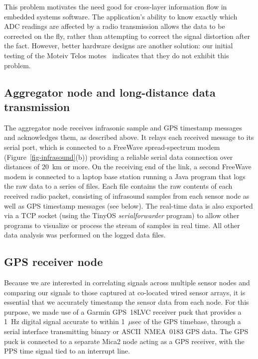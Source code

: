 This problem motivates the need good for cross-layer information flow 
in embedded systems software. The application's ability to know
exactly which ADC readings are affected by a radio transmission allows
the data to be corrected on the fly, rather than attempting to
correct the signal distortion after the fact.
However, better hardware designs are another solution: our initial testing 
of the Moteiv Telos motes~\cite{telos} indicates that they do not exhibit
this problem.

\subsection{Aggregator node and long-distance data transmission}

The aggregator node receives infrasonic sample and GPS timestamp 
messages and acknowledges them, as described above. It 
relays each received message to its serial port, which is connected 
to a FreeWave spread-spectrum modem (Figure~\ref{fig-infrasound}(b)) providing
a reliable serial data connection over distances of 20~km or more. 
On the receiving end of the link, a second FreeWave modem is connected to a
laptop base station running a Java program that logs the raw data to a series
of files. Each file contains the raw contents of each
received radio packet, consisting of infrasound samples from each
sensor node as well as GPS timestamp messages (see below). The
real-time data is also exported via a TCP socket (using the TinyOS
{\em serialforwarder} program) to allow other programs to visualize 
or process the stream of samples in real time. 
All other data analysis was performed on the logged data files.

\subsection{GPS receiver node}
\label{sec-gps}

Because we are interested in correlating signals across multiple
sensor nodes and comparing our signals to those captured at
co-located wired sensor arrays, it is essential that we
accurately timestamp the sensor data from each
node. For this purpose, we made use of a Garmin GPS~18LVC receiver
puck that provides a 1~Hz digital signal accurate 
to within 1~$\mu$sec of the GPS timebase, through a serial
interface transmitting binary or ASCII~NMEA~0183 GPS data.
The GPS puck is connected to a separate Mica2 node acting as a GPS
receiver, with the PPS time signal tied to an interrupt line.

